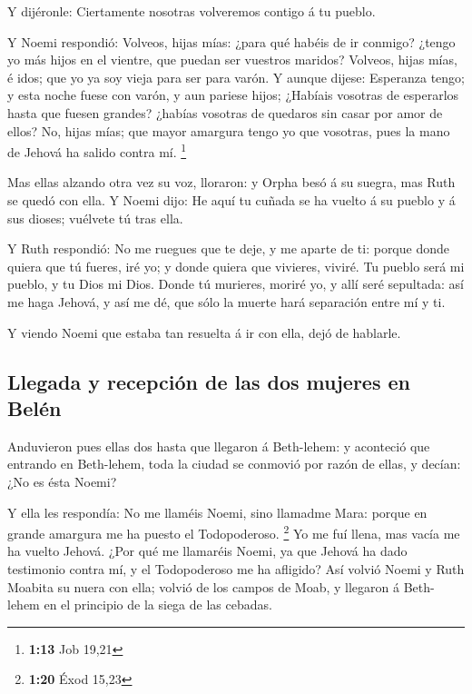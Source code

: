  Y dijéronle: Ciertamente nosotras volveremos contigo á tu
pueblo.

 Y Noemi respondió: Volveos, hijas mías: ¿para qué habéis
de ir conmigo? ¿tengo yo más hijos en el vientre, que puedan ser
vuestros maridos?  Volveos, hijas mías, é idos; que yo ya
soy vieja para ser para varón. Y aunque dijese: Esperanza tengo; y esta
noche fuese con varón, y aun pariese hijos;  ¿Habíais
vosotras de esperarlos hasta que fuesen grandes? ¿habías vosotras de
quedaros sin casar por amor de ellos? No, hijas mías; que mayor amargura
tengo yo que vosotras, pues la mano de Jehová ha salido contra mí.
\footnote{\textbf{1:13} Job 19,21}

 Mas ellas alzando otra vez su voz, lloraron: y Orpha besó
á su suegra, mas Ruth se quedó con ella.  Y Noemi dijo: He
aquí tu cuñada se ha vuelto á su pueblo y á sus dioses; vuélvete tú tras
ella.

 Y Ruth respondió: No me ruegues que te deje, y me aparte
de ti: porque donde quiera que tú fueres, iré yo; y donde quiera que
vivieres, viviré. Tu pueblo será mi pueblo, y tu Dios mi Dios.
 Donde tú murieres, moriré yo, y allí seré sepultada: así
me haga Jehová, y así me dé, que sólo la muerte hará separación entre mí
y ti.

 Y viendo Noemi que estaba tan resuelta á ir con ella, dejó
de hablarle.

\hypertarget{llegada-y-recepciuxf3n-de-las-dos-mujeres-en-beluxe9n}{%
\subsection{Llegada y recepción de las dos mujeres en
Belén}\label{llegada-y-recepciuxf3n-de-las-dos-mujeres-en-beluxe9n}}

 Anduvieron pues ellas dos hasta que llegaron á Beth-lehem:
y aconteció que entrando en Beth-lehem, toda la ciudad se conmovió por
razón de ellas, y decían: ¿No es ésta Noemi?

 Y ella les respondía: No me llaméis Noemi, sino llamadme
Mara: porque en grande amargura me ha puesto el Todopoderoso.
\footnote{\textbf{1:20} Éxod 15,23}  Yo me fuí llena, mas
vacía me ha vuelto Jehová. ¿Por qué me llamaréis Noemi, ya que Jehová ha
dado testimonio contra mí, y el Todopoderoso me ha afligido?
 Así volvió Noemi y Ruth Moabita su nuera con ella; volvió
de los campos de Moab, y llegaron á Beth-lehem en el principio de la
siega de las cebadas.

